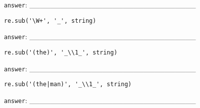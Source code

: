 \documentclass[a4paper,11pt]{scrartcl}
\begin{document}
\verb|answer|: \_\_\_\_\_\_\_\_\_\_\_\_\_\_\_\_\_\_\_\_\_\_\_\_\_\_\_\_\_\_\_\_
 

\begin{verbatim}
re.sub('\W+', '_', string)
\end{verbatim}
  
\verb|answer|: \_\_\_\_\_\_\_\_\_\_\_\_\_\_\_\_\_\_\_\_\_\_\_\_\_\_\_\_\_\_\_\_
 

\begin{verbatim}
re.sub('(the)', '_\\1_', string)
\end{verbatim}
  
\verb|answer|: \_\_\_\_\_\_\_\_\_\_\_\_\_\_\_\_\_\_\_\_\_\_\_\_\_\_\_\_\_\_\_\_
 

\begin{verbatim}
re.sub('(the|man)', '_\\1_', string)
\end{verbatim}

\verb|answer|: \_\_\_\_\_\_\_\_\_\_\_\_\_\_\_\_\_\_\_\_\_\_\_\_\_\_\_\_\_\_\_\_
\end{document}
